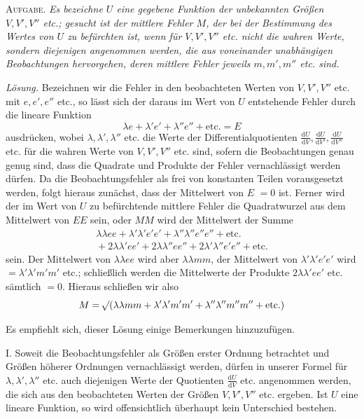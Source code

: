 \textsc{Aufgabe.} \textit{Es bezeichne \(U\) eine gegebene Funktion der unbekannten Größen \(V,V',V''\) etc.; gesucht ist der mittlere Fehler \(M\), der bei der Bestimmung des Wertes von \(U\) zu befürchten ist, wenn für \(V,V',V''\) etc. nicht die wahren Werte, sondern diejenigen angenommen werden, die aus voneinander unabhängigen Beobachtungen hervorgehen, deren mittlere Fehler jeweils \(m,m',m''\) etc. sind.}

\textit{Lösung.} Bezeichnen wir die Fehler in den beobachteten Werten von \(V,V',V''\) etc. mit \(e,e',e''\) etc., so lässt sich der daraus im Wert von \(U\) entstehende Fehler durch die lineare Funktion
\[
\lambda e+\lambda'e'+\lambda''e''+\text{etc.}=E
\]
ausdrücken, wobei \(\lambda,\lambda',\lambda''\) etc. die Werte der Differentialquotienten \linebreak[4]\(\frac{\mathrm{d}U}{\mathrm{d}V},\frac{\mathrm{d}U}{\mathrm{d}V'},\frac{\mathrm{d}U}{\mathrm{d}V''}\) etc. für die wahren Werte von \(V,V',V''\) etc. sind, sofern die Beobachtungen genau genug sind, dass die Quadrate und Produkte der Fehler vernachlässigt werden dürfen. Da die Beobachtungsfehler als frei von konstanten Teilen vorausgesetzt werden, folgt hieraus zunächst, dass der Mittelwert von \(E\) \(=0\) ist. Ferner wird der im Wert von \(U\) zu befürchtende mittlere Fehler die Quadratwurzel aus dem Mittelwert von \(EE\) sein, oder \(MM\) wird der Mittelwert der Summe
\[
\begin{aligned}
\lambda\lambda ee+\lambda'\lambda'e'e'+\lambda''\lambda''e''e''+\text{etc.}{}\\
{}+2\lambda\lambda'ee'+2\lambda\lambda''ee''+2\lambda'\lambda''e'e''+\text{etc.}
\end{aligned}
\]
sein. Der Mittelwert von \(\lambda\lambda ee\) wird aber \(\lambda\lambda mm\), der Mittelwert von \(\lambda'\lambda'e'e'\) wird \(=\lambda'\lambda'm'm'\) etc.; schließlich werden die Mittelwerte der Produkte \(2\lambda\lambda'ee'\) etc. sämtlich \(=0\). Hieraus schließen wir also
\[
M=\mathord{{}^{}\!\surd}(\lambda\lambda mm+\lambda'\lambda'm'm'+\lambda''\lambda''m''m''+\text{etc.})
\]
\par
Es empfiehlt sich, dieser Lösung einige Bemerkungen hinzuzufügen.

I. Soweit die Beobachtungsfehler als Größen erster Ordnung betrachtet und Größen höherer Ordnungen vernachlässigt werden, dürfen in unserer Formel für \(\lambda,\lambda',\lambda''\) etc. auch diejenigen Werte der Quotienten \(\frac{\mathrm{d}U}{\mathrm{d}V}\) etc. angenommen werden, die sich aus den beobachteten Werten der Größen \(V,V',V''\) etc. ergeben. Ist \(U\) eine lineare Funktion, so wird offensichtlich überhaupt kein Unterschied bestehen.

